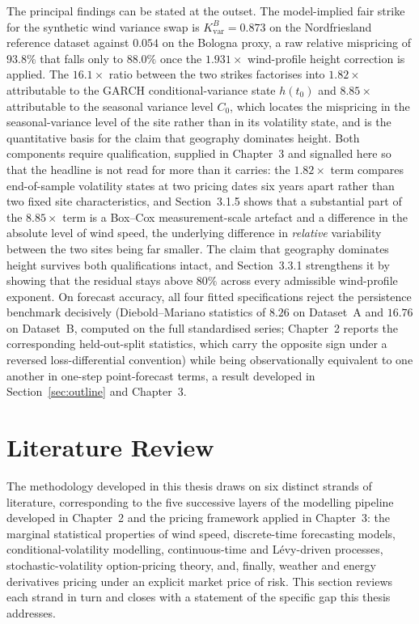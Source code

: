﻿\documentclass[11pt, a4paper, twoside]{article}
\begin{document}
The principal findings can be stated at the outset. The model-implied fair strike for the synthetic wind variance swap is $K_{\text{var}}^B = 0.873$ on the Nordfriesland reference dataset against $0.054$ on the Bologna proxy, a raw relative mispricing of $93.8\%$ that falls only to $88.0\%$ once the $1.931\times$ wind-profile height correction is applied. The $16.1\times$ ratio between the two strikes factorises into $1.82\times$ attributable to the GARCH conditional-variance state $h(t_0)$ and $8.85\times$ attributable to the seasonal variance level $C_0$, which locates the mispricing in the seasonal-variance level of the site rather than in its volatility state, and is the quantitative basis for the claim that geography dominates height. Both components require qualification, supplied in Chapter~3 and signalled here so that the headline is not read for more than it carries: the $1.82\times$ term compares end-of-sample volatility states at two pricing dates six years apart rather than two fixed site characteristics, and Section~3.1.5 shows that a substantial part of the $8.85\times$ term is a Box--Cox measurement-scale artefact and a difference in the absolute level of wind speed, the underlying difference in \emph{relative} variability between the two sites being far smaller. The claim that geography dominates height survives both qualifications intact, and Section~3.3.1 strengthens it by showing that the residual stays above $80\%$ across every admissible wind-profile exponent. On forecast accuracy, all four fitted specifications reject the persistence benchmark decisively (Diebold--Mariano statistics of $8.26$ on Dataset~A and $16.76$ on Dataset~B, computed on the full standardised series; Chapter~2 reports the corresponding held-out-split statistics, which carry the opposite sign under a reversed loss-differential convention) while being observationally equivalent to one another in one-step point-forecast terms, a result developed in Section~\ref{sec:outline} and Chapter~3.

\section{Literature Review}
\label{sec:litreview}

The methodology developed in this thesis draws on six distinct strands of literature, corresponding to the five successive layers of the modelling pipeline developed in Chapter~2 and the pricing framework applied in Chapter~3: the marginal statistical properties of wind speed, discrete-time forecasting models, conditional-volatility modelling, continuous-time and Lévy-driven processes, stochastic-volatility option-pricing theory, and, finally, weather and energy derivatives pricing under an explicit market price of risk. This section reviews each strand in turn and closes with a statement of the specific gap this thesis addresses.
\end{document}
